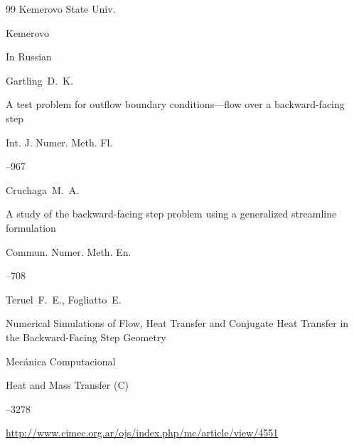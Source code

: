 \begin{thebibliography}{99}
\publ Kemerovo State Univ.

\publaddr Kemerovo


\lang In Russian







\by Gartling~D.~K.

\paper A test problem for outflow boundary conditions---flow over a backward-facing step

\jour Int. J. Numer. Meth. Fl.




--967





\by Cruchaga~M.~A.

\paper A study of the backward-facing step problem using a generalized streamline formulation

\jour Commun. Numer. Meth. En.




--708





\by Teruel~F.~E., Fogliatto~E.

\paper Numerical Simulations of Flow, Heat Transfer and Conjugate Heat Transfer in the Backward-Facing Step Geometry

\jour Mec\'anica Computacional




\issueinfo Heat and Mass Transfer (C)

--3278

\elink \url{http://www.cimec.org.ar/ojs/index.php/mc/article/view/4551}







\end{thebibliography}
